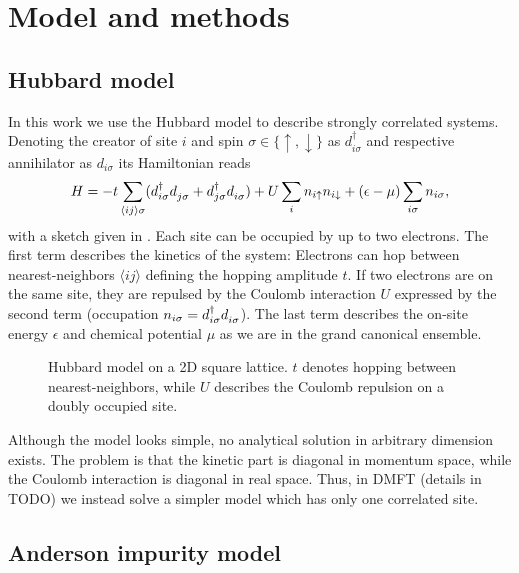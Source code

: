 
\chapter{Model and methods}

\section{Hubbard model}

In this work we use the Hubbard model \cite{Hubbard1997} to describe strongly correlated systems.
Denoting the creator of site $i$ and spin $\sigma\in\{\uparrow,\downarrow\}$
as $d^\dag_{i\sigma}$ and respective annihilator as $d_{i\sigma}$ its Hamiltonian reads
\begin{equation}
    H
    =
    -t\sum_{\langle i j\rangle\sigma}
    (d^\dag_{i\sigma} d^{\pdag}_{j\sigma} + d^\dag_{j\sigma} d^{\pdag}_{i\sigma})
    +
    U\sum_i n_{i\uparrow} n_{i\downarrow}
    +
    (\epsilon - \mu)\sum_{i\sigma} n_{i\sigma},
\end{equation}
with a sketch given in .
Each site can be occupied by up to two electrons.
The first term describes the kinetics of the system:
Electrons can hop between nearest-neighbors $\langle i j\rangle$
defining the hopping amplitude $t$.
If two electrons are on the same site, they are repulsed by the Coulomb interaction $U$
expressed by the second term (occupation $n_{i\sigma} = d^\dag_{i\sigma} d^{\pdag}_{i\sigma}$).
The last term describes the on-site energy $\epsilon$ and
chemical potential $\mu$ as we are in the grand canonical ensemble.

\begin{figure}[ht]
    \centering
    
    \caption{
        Hubbard model on a 2D square lattice.
        $t$ denotes hopping between nearest-neighbors,
        while $U$ describes the Coulomb repulsion on a doubly occupied site.
    }
    \label{fig:hubbard-model}
\end{figure}

Although the model looks simple, no analytical solution in arbitrary dimension exists.
The problem is that the kinetic part is diagonal in momentum space,
while the Coulomb interaction is diagonal in real space.
Thus, in DMFT (details in TODO) we instead solve a simpler model which has only one correlated site.

\section{Anderson impurity model}
\label{sec:anderson-impurity-model}

